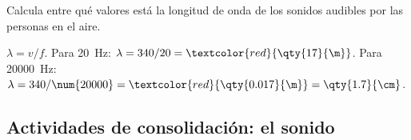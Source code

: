 \begin{exercise}
    Calcula entre qué valores está la longitud de onda de los sonidos audibles por las personas en el aire.
    \begin{solu}
        \(\lambda = v/f\). Para \qty{20}{\hertz}: \(\lambda = 340/20 = \textcolor{red}{\qty{17}{\m}}\). Para \qty{20000}{\hertz}: \(\lambda = 340/\num{20000} = \textcolor{red}{\qty{0.017}{\m}} = \qty{1.7}{\cm}\).
    \end{solu}
\end{exercise}

\subsection*{Actividades de consolidación: el sonido}


